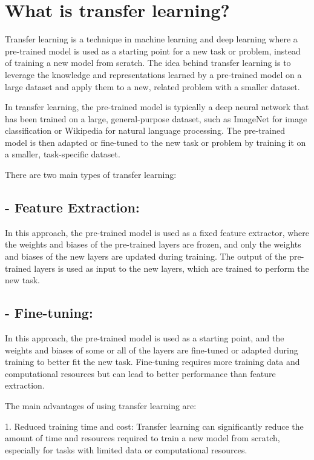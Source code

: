 \section{What is transfer learning?}
Transfer learning is a technique in machine learning and deep learning where a pre-trained model is used as a starting point for a new task or problem, instead of training a new model from scratch. The idea behind transfer learning is to leverage the knowledge and representations learned by a pre-trained model on a large dataset and apply them to a new, related problem with a smaller dataset.

In transfer learning, the pre-trained model is typically a deep neural network that has been trained on a large, general-purpose dataset, such as ImageNet for image classification or Wikipedia for natural language processing. The pre-trained model is then adapted or fine-tuned to the new task or problem by training it on a smaller, task-specific dataset.

There are two main types of transfer learning:

\subsection{- Feature Extraction:}  In this approach, the pre-trained model is used as a fixed feature extractor, where the weights and biases of the pre-trained layers are frozen, and only the weights and biases of the new layers are updated during training. The output of the pre-trained layers is used as input to the new layers, which are trained to perform the new task.

\subsection{- Fine-tuning:}  In this approach, the pre-trained model is used as a starting point, and the weights and biases of some or all of the layers are fine-tuned or adapted during training to better fit the new task. Fine-tuning requires more training data and computational resources but can lead to better performance than feature extraction.

The main advantages of using transfer learning are:

1. Reduced training time and cost: Transfer learning can significantly reduce the amount of time and resources required to train a new model from scratch, especially for tasks with limited data or computational resources.

